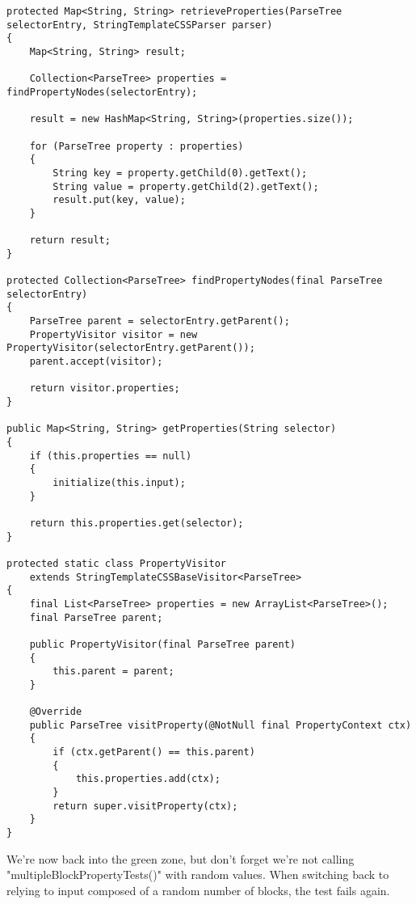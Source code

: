 \documentclass[11pt]{article}
\begin{document}
\begin{verbatim}
protected Map<String, String> retrieveProperties(ParseTree selectorEntry, StringTemplateCSSParser parser)
{
    Map<String, String> result;

    Collection<ParseTree> properties = findPropertyNodes(selectorEntry);

    result = new HashMap<String, String>(properties.size());

    for (ParseTree property : properties)
    {
        String key = property.getChild(0).getText();
        String value = property.getChild(2).getText();
        result.put(key, value);
    }

    return result;
}

protected Collection<ParseTree> findPropertyNodes(final ParseTree selectorEntry)
{
    ParseTree parent = selectorEntry.getParent();
    PropertyVisitor visitor = new PropertyVisitor(selectorEntry.getParent());
    parent.accept(visitor);

    return visitor.properties;
}

public Map<String, String> getProperties(String selector)
{
    if (this.properties == null)
    {
        initialize(this.input);
    }

    return this.properties.get(selector);
}

protected static class PropertyVisitor
    extends StringTemplateCSSBaseVisitor<ParseTree>
{
    final List<ParseTree> properties = new ArrayList<ParseTree>();
    final ParseTree parent;

    public PropertyVisitor(final ParseTree parent)
    {
        this.parent = parent;
    }

    @Override
    public ParseTree visitProperty(@NotNull final PropertyContext ctx)
    {
        if (ctx.getParent() == this.parent)
        {
            this.properties.add(ctx);
        }
        return super.visitProperty(ctx);
    }
}
\end{verbatim}

We're now back into the green zone, but don't forget we're not calling "multipleBlockPropertyTests()" with random values. When
switching back to relying to input composed of a random number of blocks, the test fails again.
\end{document}

